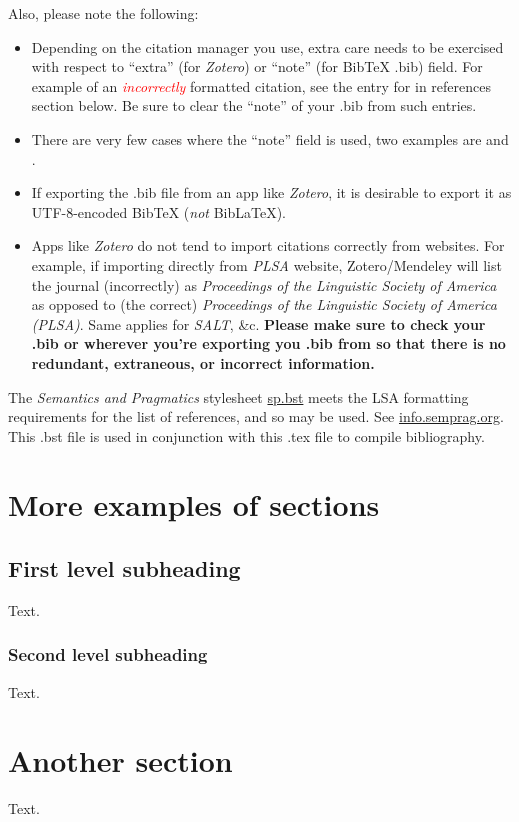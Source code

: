 \documentclass[11pt, letterpaper]{article}
\begin{document}
Also, please note the following:
\begin{itemize}
    \item Depending on the citation manager you use, extra care needs to be exercised with respect to ``extra'' (for \textit{Zotero}) or ``note'' (for BibTeX .bib) field. For example of an \textcolor{red}{\textit{incorrectly}} formatted citation, see the entry for \cite{sankoff_formal_1981} in references section below. Be sure to clear the ``note'' of your .bib from such entries.
    \item There are very few cases where the ``note'' field is used, two examples are \cite{ozernyi_linguistic_2022} and \cite{ozernyi_rise_2022}.
    \item If exporting the .bib file from an app like \textit{Zotero}, it is desirable to export it as UTF-8-encoded BibTeX (\textit{not} BibLaTeX).
    \item Apps like \textit{Zotero} do not tend to import citations correctly from websites. For example, if importing directly from \textit{PLSA} website, Zotero/Mendeley will list the journal (incorrectly) as \textit{Proceedings of the Linguistic Society of America} as opposed to (the correct) \textit{Proceedings of the Linguistic Society of America (PLSA)}. Same applies for \textit{SALT}, \&c. \textbf{Please make sure to check your .bib or wherever you're exporting you .bib from so that there is no redundant, extraneous, or incorrect information.}
\end{itemize}

The \textit{Semantics and Pragmatics} stylesheet \href{https://raw.githubusercontent.com/semprag/tex/master/sp.bst}{sp.bst} meets the LSA formatting requirements for the list of references, and so may be used. See \href{http://info.semprag.org}{info.semprag.org}. This .bst file is used in conjunction with this .tex file to compile bibliography.

\section{More examples of sections}
\subsection{First level subheading}
Text.
\subsubsection{Second level subheading}
Text.
\section{Another section}
Text.
\end{document}
